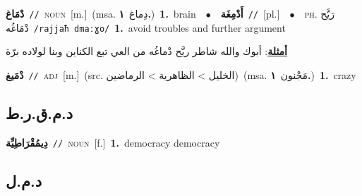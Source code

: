 \documentclass[10pt,a4paper,twoside]{article} %
\begin{document}
\begin{multicols}{2}
{\setlength\topsep{0pt}\textbf{\foreignlanguage{arabic}{دْمَاغ}}\ {\color{gray}\texttt{//}\color{black}}\ \textsc{noun}\ [m.]\ \color{gray}(msa. \foreignlanguage{arabic}{دِماغ}~\foreignlanguage{arabic}{\textbf{١.}})\color{black}\ \textbf{1.}~brain\ \ $\bullet$\ \ \setlength\topsep{0pt}\textbf{\foreignlanguage{arabic}{أَدْمِغَة}}\ {\color{gray}\texttt{//}\color{black}}\ [pl.]\ \ $\bullet$\ \ \textsc{ph.} \color{gray} \foreignlanguage{arabic}{رَيَّح دْمَاغُه}\color{black}\ {\color{gray}\texttt{/{\sffamily rajjaħ dmaːɣo}/}\color{black}}\ \textbf{1.}~avoid troubles and further argument\  \begin{flushright}\color{gray}\foreignlanguage{arabic}{\textbf{\underline{\foreignlanguage{arabic}{أمثلة}}}: أبوك والله شاطر ريَّح دْماغُه من العي تبع الكناين وبنا لولاده برّة}\end{flushright}\color{black}} \vspace{2mm}

{\setlength\topsep{0pt}\textbf{\foreignlanguage{arabic}{دْمَيغ}}\ {\color{gray}\texttt{//}\color{black}}\ \textsc{adj}\ [m.]\ (src. \color{gray}\foreignlanguage{arabic}{الخليل > الظاهرية > الرماضين}\color{black})\ \color{gray}(msa. \foreignlanguage{arabic}{مَجْنون}~\foreignlanguage{arabic}{\textbf{١.}})\color{black}\ \textbf{1.}~crazy\ } \vspace{2mm}

\vspace{-3mm}
\subsection*{\color{blue}\foreignlanguage{arabic}{د.م.ق.ر.ط}\color{blue}{ (ntws)}} 

{\setlength\topsep{0pt}\textbf{\foreignlanguage{arabic}{دِيمُقْرَاطِيِّة}}\ {\color{gray}\texttt{//}\color{black}}\ \textsc{noun}\ [f.]\ \textbf{1.}~democracy democracy\ } \vspace{2mm}

\vspace{-3mm}
\subsection*{\color{blue}\foreignlanguage{arabic}{د.م.ل}\color{blue}{}} 


\end{multicols}
\end{document}
